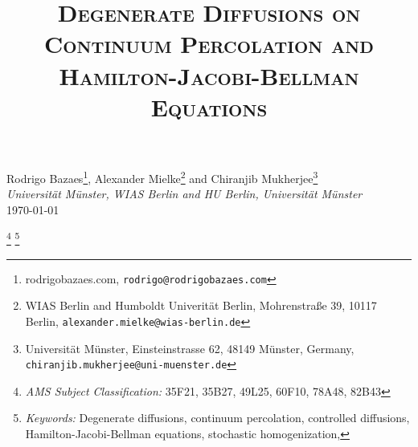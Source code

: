 \documentclass[11pt]{article}
\theoremstyle{rem}
\begin{document}
\title{\textsc{Degenerate Diffusions on Continuum Percolation and Hamilton-Jacobi-Bellman Equations}}


\maketitle

 




\begin{center}
{\sc Rodrigo Bazaes}\footnote{rodrigobazaes.com, {\tt rodrigo@rodrigobazaes.com}},
{\sc Alexander Mielke}\footnote{WIAS Berlin and Humboldt Univerit\"at Berlin, Mohrenstra\ss{}e 39,  10117 Berlin,
    {\tt alexander.mielke@wias-berlin.de}}  
and  
{\sc Chiranjib Mukherjee}\footnote{Universit\"at M\"unster, Einsteinstrasse 62,
      48149 M\"unster, Germany, {\tt chiranjib.mukherjee@uni-muenster.de}}
\\[0.5em]
\textit{Universit\"at M\"unster, WIAS Berlin and HU Berlin, Universit\"at
  M\"unster}
\\[0.5em]
\today
\end{center}

{
\renewcommand{\thefootnote}{}
\footnote{\textit{AMS Subject
Classification:} {35F21, 35B27, 49L25, 60F10, 78A48, 82B43}}
\footnote{\textit{Keywords:} Degenerate diffusions, continuum percolation, controlled diffusions, Hamilton-Jacobi-Bellman equations, stochastic homogenization,}
}
\end{document}

